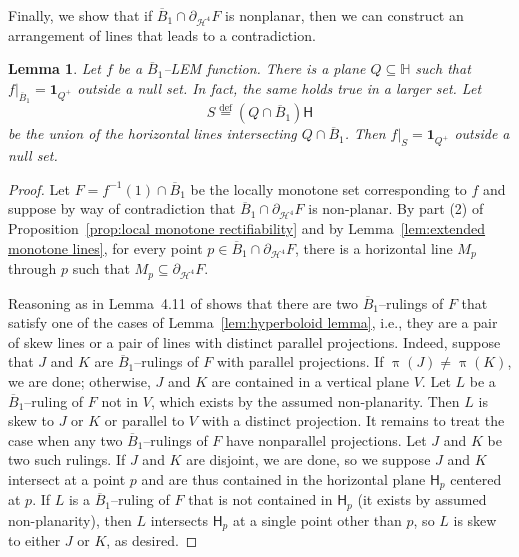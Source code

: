 \documentclass[11pt,reqno]{amsart}
\renewcommand{\H}{\mathbb{H}}
\newcommand{\cH}{\mathcal{H}}
\newcommand{\0}{\mathbf{0}}
\renewcommand{\1}{\mathbf 1}
\newcommand{\one}{\mathbf{1}}
\renewcommand{\subset}{\subseteq}
\newcommand{\eqdef}{\stackrel{\mathrm{def}}{=}}
\newtheorem{lemma}[thm]{Lemma}
\theoremstyle{remark}
\begin{document}
Finally, we show that if $\overline{B}_1\cap \partial_{\cH^4} F$ is nonplanar, then we can construct an arrangement of lines that leads to a contradiction.
\begin{lemma}\label{lem:LEM half-spaces}
  Let $f$ be a $\overline{B}_1$--LEM function.  There is a plane $Q\subset \H$ such that $f|_{\overline{B}_1}=\one_{Q^+}$ outside a null set. In fact, the same holds true in a larger set.  Let
  \begin{equation}\label{eq:def S union}
  S\eqdef  (Q \cap \overline{B}_1)\mathsf{H}
  \end{equation}
  be the union of the horizontal lines intersecting $Q \cap \overline{B}_1$.
  Then $f|_{S}=\one_{Q^+}$ outside a null set.
\end{lemma}
\begin{proof}
  Let $F=f^{-1}(1)\cap \overline{B}_1$ be the locally monotone set corresponding to $f$ and suppose by way of contradiction that $\overline{B}_1\cap \partial_{\cH^4} F$ is non-planar.  By part (2) of Proposition~\ref{prop:local monotone rectifiability} and by Lemma~\ref{lem:extended monotone lines}, for every point $p\in \overline{B}_1\cap \partial_{\cH^4} F$, there is a horizontal line $M_p$ through $p$ such that $M_p\subset \partial_{\cH^4} F$.

  Reasoning as in Lemma~4.11 of \cite{CheegerKleinerMetricDiff} shows that there are two $\overline{B}_1$--rulings of $F$ that satisfy one of the cases of Lemma~\ref{lem:hyperboloid lemma}, i.e., they are a pair of skew lines or a pair of lines with distinct parallel projections.  Indeed, suppose that $J$ and $K$ are $\overline{B}_1$--rulings of $F$ with parallel projections.  If $\uppi(J)\ne\uppi(K)$, we are done; otherwise, $J$ and $K$ are contained in a vertical plane $V$.  Let $L$ be a $\overline{B}_1$--ruling of $F$ not in $V$, which exists by the assumed non-planarity.  Then $L$ is skew to $J$ or $K$ or parallel to $V$ with a distinct projection. It remains to treat the case when any two $\overline{B}_1$--rulings of $F$ have nonparallel projections.  Let $J$ and $K$ be two such rulings.  If $J$ and $K$ are disjoint, we are done, so we suppose $J$ and $K$ intersect at a point $p$ and are thus contained in the horizontal plane $\mathsf{H}_p$ centered at $p$.  If $L$ is a $\overline{B}_1$--ruling of $F$ that is not contained in $\mathsf{H}_p$ (it exists by assumed non-planarity), then $L$ intersects $\mathsf{H}_p$ at a single point other than $p$, so $L$ is skew to either $J$ or $K$, as desired.


\end{proof}
\end{document}

